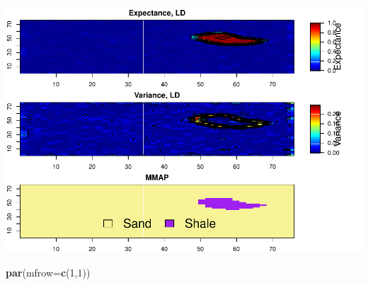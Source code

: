 \documentclass[
]{article}
\newenvironment{Shaded}{\begin{snugshade}}{\end{snugshade}}
\newcommand{\DataTypeTok}[1]{\textcolor[rgb]{0.13,0.29,0.53}{#1}}
\newcommand{\DecValTok}[1]{\textcolor[rgb]{0.00,0.00,0.81}{#1}}
\newcommand{\KeywordTok}[1]{\textcolor[rgb]{0.13,0.29,0.53}{\textbf{#1}}}
\newcommand{\NormalTok}[1]{#1}
\begin{document}
\includegraphics{Ex3_files/figure-latex/unnamed-chunk-9-4.pdf}

\begin{Shaded}
\begin{Highlighting}[]
\KeywordTok{par}\NormalTok{(}\DataTypeTok{mfrow=}\KeywordTok{c}\NormalTok{(}\DecValTok{1}\NormalTok{,}\DecValTok{1}\NormalTok{))}
\end{Highlighting}
\end{Shaded}
\end{document}
